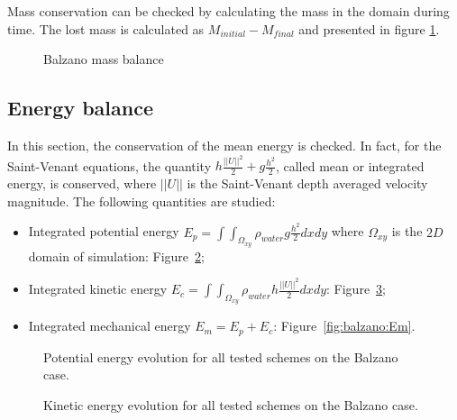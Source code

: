Mass conservation can be checked by calculating the mass in the domain during time. The lost mass is calculated as 
$M_{initial} - M_{final}$ and presented in figure \ref{fig:balzano:massbalance}. 

\begin{figure}[h!]
  \centering
  \caption{Balzano mass balance}\label{fig:balzano:massbalance}
\end{figure}

\subsection{Energy balance}

In this section, the conservation of the mean energy is checked. In fact, for the Saint-Venant equations,
the quantity $h \frac{||U||^2}{2} + g \frac{h^2}{2}$, called mean or integrated energy, is conserved,
where $||U||$ is the Saint-Venant depth averaged velocity magnitude.
The following quantities are studied:
\begin{itemize}
\item Integrated potential energy \textbf{$E_p =\int\int_{\Omega_{xy}}\rho_{water} g \frac{h^2}{2} dxdy$} where $\Omega_{xy}$ is the $2D$ domain of simulation: Figure~\ref{fig:balzano:Ep};
\item Integrated kinetic energy \textbf{$E_c =\int\int_{\Omega_{xy}} \rho_{water} h \frac{||U||^2}{2} dxdy$}: Figure~\ref{fig:balzano:Ec};
\item Integrated mechanical energy \textbf{$E_m = E_p + E_c$}: Figure~\ref{fig:balzano:Em}.
\end{itemize}

\begin{figure}[H]
  \centering
  \caption{Potential energy evolution for all tested schemes on the Balzano case.}
\label{fig:balzano:Ep}
\end{figure}

\begin{figure}[H]
  \centering
  \caption{Kinetic energy evolution for all tested schemes on the Balzano case.}
\label{fig:balzano:Ec}
\end{figure}

